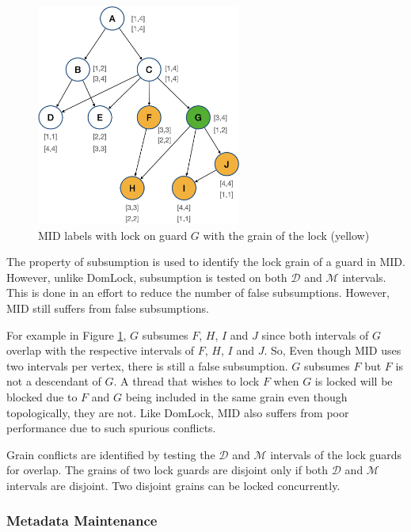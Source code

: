 \begin{figure}[H]
    \centering
    \captionsetup{justification=centering}
    \includegraphics[width=0.6\textwidth]{figures/MID_example_with_lock.png}
    \caption{MID labels with lock on guard $G$ with the grain of the lock (yellow)}
    \label{fig:MID_example_locked}
\end{figure}


The property of subsumption is used to identify the lock grain of a guard in MID. However, unlike DomLock, subsumption is tested on  both $\mathcal{D}$ and $\mathcal{M}$ intervals. 
This is done in an effort to reduce the number of false subsumptions. However, MID still suffers from false subsumptions.


For example in Figure \ref{fig:MID_example_locked}, $G$ subsumes $F$, $H$, $I$ and $J$ since both intervals of $G$ overlap with the respective intervals of $F$, $H$, $I$ and $J$. So, Even though MID uses two intervals per vertex, there is still a false subsumption. $G$ subsumes $F$ but $F$ is not a descendant of $G$. A thread that wishes to lock $F$ when $G$ is locked will be blocked due to $F$ and $G$ being included in the same grain even though topologically, they are not. Like DomLock, MID also suffers from poor performance due to such spurious conflicts.

Grain conflicts are identified by testing the $\mathcal{D}$ and $\mathcal{M}$ intervals of the lock guards for overlap. The grains of two lock guards are disjoint only if both $\mathcal{D}$ and $\mathcal{M}$ intervals are disjoint. Two disjoint grains can be locked concurrently. 

\subsubsection{Metadata Maintenance}

